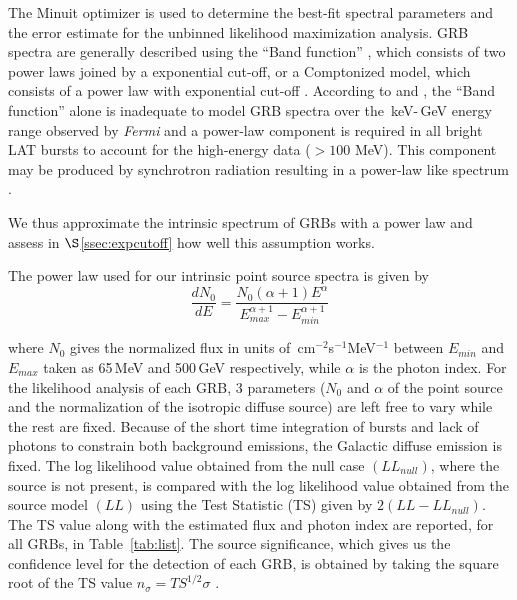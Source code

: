\documentclass[12pt,preprint]{aastex}
\begin{document}
The Minuit\footnotemark{} optimizer is used to determine the
best-fit spectral parameters and the error estimate for the unbinned
likelihood maximization analysis. 
GRB spectra are generally described using the ``Band function'' \citep{band93}, which consists of two power laws joined by a exponential cut-off, or a Comptonized model, which
consists of a power law with exponential cut-off \citep{Fermicat}.
According to \cite{Fermicat} and \cite{omodei15}, the ``Band function'' alone is inadequate to 
model GRB spectra over the \,keV-\,GeV energy range observed by {\it Fermi} and a power-law component is required in all
bright LAT bursts to account for the high-energy data ($>100\,$\,MeV).
 {This component may be produced by synchrotron
  radiation resulting in a power-law like  spectrum \cite[as reported
  by \citeauthor{PLspect2013} \citeyear{PLspect2013} and discussed
  also by][]{kd09,kd10,ghisellini10,wang10}}.

We thus approximate the intrinsic spectrum of GRBs with a power law
 {and assess
in $\S$\ref{ssec:expcutoff} how well this assumption works.}

The power law used for our {intrinsic point source spectra} is
given by
\begin{equation}
    {\frac{dN_0}{dE}} = {\frac{N_0(\alpha +1)E^\alpha}{E_{max}^{\alpha+1}-E_{min}^{\alpha+1}}}
\end{equation}




where $N_0$ gives the normalized flux in units of { \,cm$^{-2}$s$^{-1}$MeV$^{-1}$}
between $E_{min}$ and $E_{max}$ taken as 65\,MeV and
500\,GeV respectively, while $\alpha$ is the photon index. 
For the likelihood analysis of each GRB, 3 parameters ($N_0$ and $\alpha$ of
the point source and the normalization of the isotropic diffuse source) are left free to vary
while the rest are fixed.
 {Because of the short time integration of bursts and lack of photons to constrain both background emissions, the Galactic diffuse emission is fixed.}
The log likelihood value obtained from the null case $(LL_{null})$, where the source is not 
present, is compared with the 
log likelihood value obtained from the source model $(LL)$ using the Test Statistic (TS) 
given by $2(LL-LL_{null})$.
The TS value along with the estimated flux  and photon index
are reported, for all GRBs, in Table~\ref{tab:list}.
The source significance, which gives us the confidence level for the detection of each GRB,
is obtained by taking the square root of the TS value
$n_{\sigma}=TS^{1/2}\sigma$ \citep{1996ApJ}.
\end{document}
